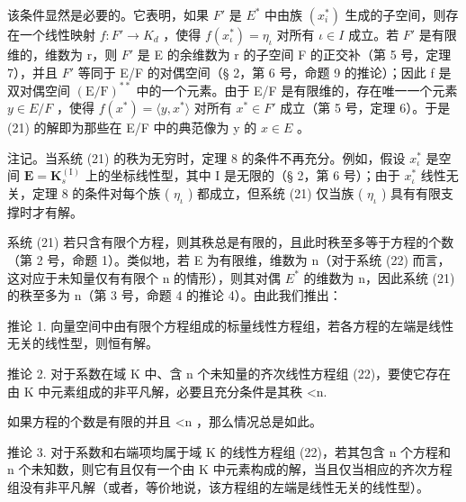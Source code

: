 该条件显然是必要的。它表明，如果 \(F'\) 是 \(E^{*}\) 中由族 \((x_{i}^{*})\) 生成的子空间，则存在一个线性映射 \(f:F'\to K_{d}\) ，使得 \(f(x_{\iota}^{*})=\eta_{\iota}\) 对所有 \(\iota\in I\) 成立。若 \(F'\) 是有限维的，维数为 r，则 \(F'\) 是 E 的余维数为 r 的子空间 F 的正交补（第 5 号，定理 7），并且 \(F'\) 等同于 E/F 的对偶空间（§ 2，第 6 号，命题 9 的推论）；因此 f 是双对偶空间 \((\mathrm{E}/\mathrm{F})^{**}\) 中的一个元素。由于 E/F 是有限维的，存在唯一一个元素 \(y\in E/F\) ，使得 \(f(x^{*})=\langle y,x^{*}\rangle\) 对所有 \(x^{*}\in F'\) 成立（第 5 号，定理 6）。于是 (21) 的解即为那些在 E/F 中的典范像为 y 的 \(x\in E\) 。

注记。当系统 (21) 的秩为无穷时，定理 8 的条件不再充分。例如，假设 \(x_{\iota}^{*}\) 是空间 \(\mathbf{E} = \mathbf{K}_{s}^{(\mathrm{I})}\) 上的坐标线性型，其中 I 是无限的（§ 2，第 6 号）；由于 \(x_{\iota}^{*}\) 线性无关，定理 8 的条件对每个族 ( \(\eta_{\iota}\) ) 都成立，但系统 (21) 仅当族 ( \(\eta_{\iota}\) ) 具有有限支撑时才有解。

系统 (21) 若只含有限个方程，则其秩总是有限的，且此时秩至多等于方程的个数（第 2 号，命题 1）。类似地，若 E 为有限维，维数为 n（对于系统 (22) 而言，这对应于未知量仅有有限个 n 的情形），则其对偶 \(E^{*}\) 的维数为 n，因此系统 (21) 的秩至多为 n（第 3 号，命题 4 的推论 4）。由此我们推出：

推论 1. 向量空间中由有限个方程组成的标量线性方程组，若各方程的左端是线性无关的线性型，则恒有解。

推论 2. 对于系数在域 K 中、含 n 个未知量的齐次线性方程组 (22)，要使它存在由 K 中元素组成的非平凡解，必要且充分条件是其秩 \textless n.

如果方程的个数是有限的并且 \textless n ，那么情况总是如此。

推论 3. 对于系数和右端项均属于域 K 的线性方程组 (22)，若其包含 n 个方程和 n 个未知数，则它有且仅有一个由 K 中元素构成的解，当且仅当相应的齐次方程组没有非平凡解（或者，等价地说，该方程组的左端是线性无关的线性型）。

